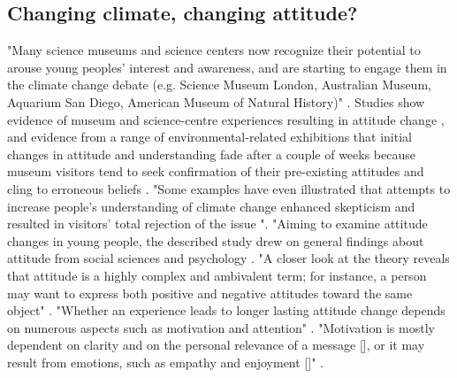 \subsection{Changing climate, changing attitude?}
"Many science museums and science centers now recognize their potential to arouse young peoples’ interest and awareness, and are starting to engage them in the climate change debate (e.g. Science Museum London, Australian Museum, Aquarium San Diego, American Museum of Natural History)" \autocite[p. 95]{gorr_changing_2014}. Studies show evidence of museum and science-centre experiences resulting in attitude change \autocite{smithsonian_2011}, and evidence from a range of environmental-related exhibitions that initial changes in attitude and understanding fade after a couple of weeks because museum visitors tend to seek confirmation of their pre-existing attitudes and cling to erroneous beliefs \autocite{Cakir_2008}. "Some examples have even illustrated that attempts to increase people’s understanding of climate change enhanced skepticism and resulted in visitors’ total rejection of the issue \autocite{guardian_2009}". "Aiming to examine attitude changes in young people, the described study drew on general findings about attitude from social sciences and psychology \autocite[p. 96]{gorr_changing_2014}. "A closer look at the theory reveals that attitude is a highly complex and ambivalent term; for instance, a person may want to express both positive and negative attitudes toward the same object" \autocite[p. 96]{gorr_changing_2014}. "Whether an experience leads to longer lasting attitude change depends on numerous aspects such as motivation and attention" \autocite[p. 96]{gorr_changing_2014}. "Motivation is mostly dependent on clarity and on the personal relevance of a message [\autocite{salazar_mediations_2011}], or it may result from emotions, such as empathy and enjoyment [\autocite{Roberts_1997}]" \autocite[p. 96]{gorr_changing_2014}.

\break
